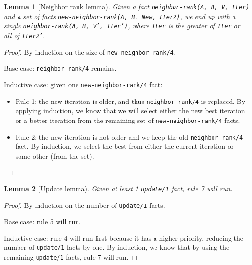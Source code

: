 \documentclass[9pt]{article}
\newtheorem{lemma}{Lemma}
\begin{document}
\begin{lemma}[Neighbor rank lemma]
Given a fact \texttt{neighbor-rank(A, B, V, Iter)} and a set of facts
\texttt{new-neighbor-rank(A, B, New, Iter2)}, we end up with a single
\texttt{neighbor-rank(A, B, V', Iter')}, where \texttt{Iter} is the greater of
\texttt{Iter} or all of \texttt{Iter2'}.
\end{lemma}
\begin{proof}
By induction on the size of \texttt{new-neighbor-rank/4}.

Base case: \texttt{neighbor-rank/4} remains.

Inductive case: given one \texttt{new-neighbor-rank/4} fact:

\begin{itemize}
   \item Rule 1: the new iteration is older, and thus \texttt{neighbor-rank/4}
   is replaced. By applying induction, we know that we will select either the
   new best iteration or a better iteration from the remaining set of
   \texttt{new-neighbor-rank/4} facts.
   \item Rule 2: the new iteration is not older and we keep the old
   \texttt{neighbor-rank/4} fact. By induction, we select the best from either
   the current iteration or some other (from the set).
\end{itemize}
\end{proof}

\begin{lemma}[Update lemma]
Given at least 1 \texttt{update/1} fact, rule 7 will run.
\end{lemma}
\begin{proof}
By induction on the number of \texttt{update/1} facts.

Base case: rule 5 will run.

Inductive case: rule 4 will run first because it has a higher priority, reducing
the number of \texttt{update/1} facts by one. By induction, we know that by
using the remaining \texttt{update/1} facts, rule 7 will run.
\end{proof}
\end{document}
